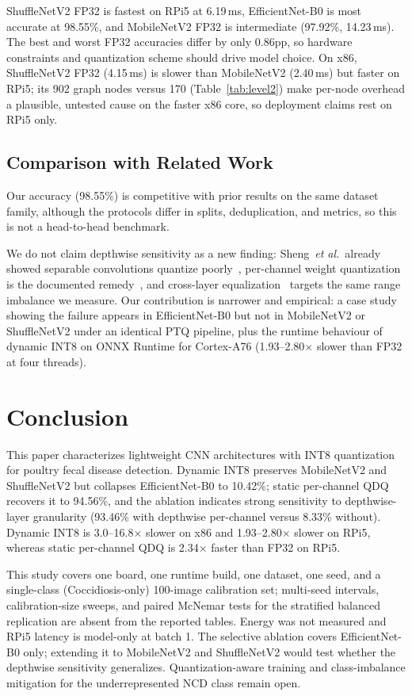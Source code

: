 \documentclass[conference,a4paper]{IEEEtran}
\begin{document}
ShuffleNetV2 FP32 is fastest on RPi5 at 6.19\,ms, EfficientNet-B0 is most accurate at 98.55\%, and MobileNetV2 FP32 is intermediate (97.92\%, 14.23\,ms). The best and worst FP32 accuracies differ by only 0.86pp, so hardware constraints and quantization scheme should drive model choice. On x86, ShuffleNetV2 FP32 (4.15\,ms) is slower than MobileNetV2 (2.40\,ms) but faster on RPi5; its 902 graph nodes versus 170 (Table~\ref{tab:level2}) make per-node overhead a plausible, untested cause on the faster x86 core, so deployment claims rest on RPi5 only.


\subsection{Comparison with Related Work}

Our accuracy (98.55\%) is competitive with prior results on the same dataset family, although the protocols differ in splits, deduplication, and metrics, so this is not a head-to-head benchmark.

We do not claim depthwise sensitivity as a new finding: Sheng~\textit{et al.}~already showed separable convolutions quantize poorly~\cite{sheng2018}, per-channel weight quantization is the documented remedy~\cite{krishnamoorthi2018}, and cross-layer equalization~\cite{nagel2019} targets the same range imbalance we measure. Our contribution is narrower and empirical: a case study showing the failure appears in EfficientNet-B0 but not in MobileNetV2 or ShuffleNetV2 under an identical PTQ pipeline, plus the runtime behaviour of dynamic INT8 on ONNX Runtime for Cortex-A76 (1.93--2.80$\times$ slower than FP32 at four threads).

\section{Conclusion}

This paper characterizes lightweight CNN architectures with INT8 quantization for poultry fecal disease detection. Dynamic INT8 preserves MobileNetV2 and ShuffleNetV2 but collapses EfficientNet-B0 to 10.42\%; static per-channel QDQ recovers it to 94.56\%, and the ablation indicates strong sensitivity to depthwise-layer granularity (93.46\% with depthwise per-channel versus 8.33\% without). Dynamic INT8 is 3.0--16.8$\times$ slower on x86 and 1.93--2.80$\times$ slower on RPi5, whereas static per-channel QDQ is 2.34$\times$ faster than FP32 on RPi5.

This study covers one board, one runtime build, one dataset, one seed, and a single-class (Coccidiosis-only) 100-image calibration set; multi-seed intervals, calibration-size sweeps, and paired McNemar tests for the stratified balanced replication are absent from the reported tables. Energy was not measured and RPi5 latency is model-only at batch 1. The selective ablation covers EfficientNet-B0 only; extending it to MobileNetV2 and ShuffleNetV2 would test whether the depthwise sensitivity generalizes. Quantization-aware training and class-imbalance mitigation for the underrepresented NCD class remain open.
\end{document}
